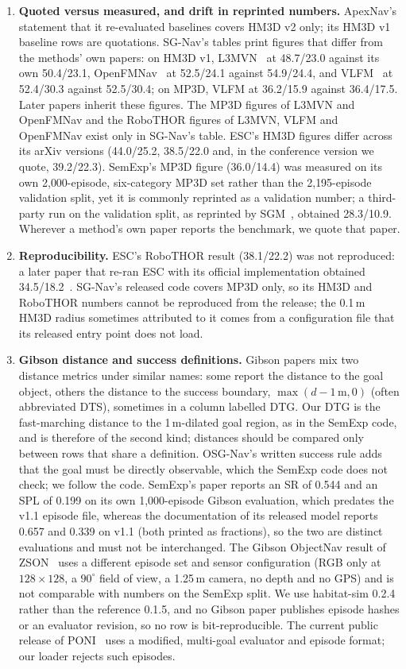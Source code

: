 \documentclass[10pt]{article}
\newcommand{\SR}{\textsc{SR}\xspace}
\newcommand{\SPL}{\textsc{SPL}\xspace}
\newcommand{\DTG}{\textsc{DTG}\xspace}
\begin{document}
\begin{enumerate}[leftmargin=*,itemsep=2pt]
\item \textbf{Quoted versus measured, and drift in reprinted numbers.} ApexNav's statement that it re-evaluated baselines covers HM3D v2 only; its HM3D v1 baseline rows are quotations. SG-Nav's tables print figures that differ from the methods' own papers: on HM3D v1, L3MVN~\citep{yu2023l3mvn} at 48.7/23.0 against its own 50.4/23.1, OpenFMNav~\citep{kuang2024openfmnav} at 52.5/24.1 against 54.9/24.4, and VLFM~\citep{yokoyama2024vlfm} at 52.4/30.3 against 52.5/30.4; on MP3D, VLFM at 36.2/15.9 against 36.4/17.5. Later papers inherit these figures. The MP3D figures of L3MVN and OpenFMNav and the RoboTHOR figures of L3MVN, VLFM and OpenFMNav exist only in SG-Nav's table. ESC's HM3D figures differ across its arXiv versions (44.0/25.2, 38.5/22.0 and, in the conference version we quote, 39.2/22.3). SemExp's MP3D figure (36.0/14.4) was measured on its own 2{,}000-episode, six-category MP3D set rather than the 2{,}195-episode validation split, yet it is commonly reprinted as a validation number; a third-party run on the validation split, as reprinted by SGM~\citep{zhang2024imagine}, obtained 28.3/10.9. Wherever a method's own paper reports the benchmark, we quote that paper.
\item \textbf{Reproducibility.} ESC's RoboTHOR result (38.1/22.2) was not reproduced: a later paper that re-ran ESC with its official implementation obtained 34.5/18.2~\citep{unlu2024reproducibility}. SG-Nav's released code covers MP3D only, so its HM3D and RoboTHOR numbers cannot be reproduced from the release; the 0.1\,m HM3D radius sometimes attributed to it comes from a configuration file that its released entry point does not load.
\item \textbf{Gibson distance and success definitions.} Gibson papers mix two distance metrics under similar names: some report the distance to the goal object, others the distance to the success boundary, $\max(d - 1\,\text{m}, 0)$ (often abbreviated DTS), sometimes in a column labelled DTG. Our \DTG is the fast-marching distance to the 1\,m-dilated goal region, as in the SemExp code, and is therefore of the second kind; distances should be compared only between rows that share a definition. OSG-Nav's written success rule adds that the goal must be directly observable, which the SemExp code does not check; we follow the code. SemExp's paper reports an \SR of 0.544 and an \SPL of 0.199 on its own 1{,}000-episode Gibson evaluation, which predates the v1.1 episode file, whereas the documentation of its released model reports 0.657 and 0.339 on v1.1 (both printed as fractions), so the two are distinct evaluations and must not be interchanged. The Gibson ObjectNav result of ZSON~\citep{majumdar2022zson} uses a different episode set and sensor configuration (RGB only at $128 \times 128$, a $90^\circ$ field of view, a 1.25\,m camera, no depth and no GPS) and is not comparable with numbers on the SemExp split. We use habitat-sim 0.2.4 rather than the reference 0.1.5, and no Gibson paper publishes episode hashes or an evaluator revision, so no row is bit-reproducible. The current public release of PONI~\citep{ramakrishnan2022poni} uses a modified, multi-goal evaluator and episode format; our loader rejects such episodes.

\end{enumerate}
\end{document}
